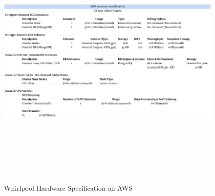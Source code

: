 \begin{figure}[h!]
  \centering
  \includegraphics[width=16cm,height=13cm,keepaspectratio]{../media/crawler/aws-resource.png}
  \caption{Whirlpool Hardware Specification on AWS}
  \label{fig:awsspec}
\end{figure}

